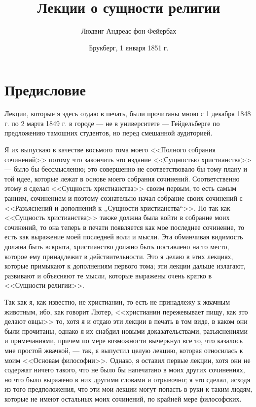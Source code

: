 \documentclass[12pt]{article}
\title{Лекции о сущности религии}
\author{Людвиг Андреас фон Фейербах}
\date{Брукберг, 1 января 1851 г.}
\begin{document}
\maketitle

\tableofcontents

{}
\section*{Предисловие}

Лекции, которые я здесь отдаю в печать, были прочитаны мною с 1 декабря 1848 г. по 2 марта 1849 г. в городе --- не в университете --- Гейдельберге по предложению тамошних студентов, но перед смешанной аудиторией. 

Я их выпускаю в качестве восьмого тома моего <<Полного собрания сочинений>>  потому что закончить это издание <<Сущностью христианства>> --- было бы бессмысленно; это совершенно не соответствовало бы тому плану и той идее, которые лежат в основе моего собрания сочинений. Соответственно этому я сделал <<Сущность христианства>> своим первым, то есть самым ранним, сочинением и поэтому сознательно начал собрание своих сочинений с <<Разъяснений и дополнений к ,,Сущности христианства``>>. Но так как <<Сущность христианства>> также должна была войти в собрание моих сочинений, то она теперь в печати появляется как мое последнее сочинение, то есть как выражение моей последней воли и мысли. Эта обманчивая видимость должна быть вскрыта, христианство должно быть поставлено на то место, которое ему принадлежит в действительности. Это я делаю в этих лекциях, которые примыкают к дополнениям первого тома; эти лекции дальше излагают, развивают и объясняют те мысли, которые выражены очень кратко в <<Сущности религии>>. 

Так как я, как известно, не христианин, то есть не принадлежу к жвачным животным, ибо, как говорит Лютер, <<христианин пережевывает пищу, как это делают овцы>>  то, хотя я и отдаю эти лекции в печать в том виде, в каком они были прочитаны, однако я их снабдил новыми доказательствами, разъяснениями и примечаниями, причем по мере возможности вычеркнул все то, что казалось мне простой жвачкой, --- так, я выпустил целую лекцию, которая относилась к моим <<Основам философии>>. Однако, я оставил первые лекции, хотя они не содержат ничего такого, что не было бы напечатано в моих других сочинениях, но что было выражено в них другими словами и отрывочно; я это сделал, исходя из того предположения, что эти мои лекции могут попасть в руки к таким людям, которые не имеют остальных моих сочинений, по крайней мере философских. 
\end{document}
